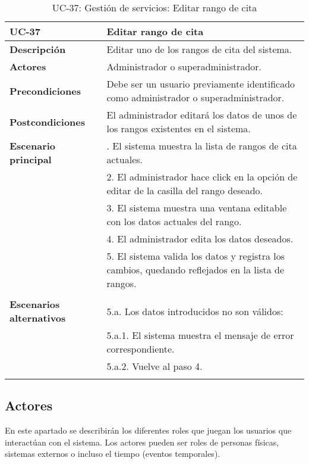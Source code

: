 \begin{table}[H]
  \begin{center}
    \begin{tabularx}{16.4cm}{|l|X|}
      \hline
      \textbf{UC-37} & \textbf{Editar rango de cita}\\
      \hline
      \textbf{Descripción} & Editar uno de los rangos de cita del sistema.\\
      \hline
      \textbf{Actores} & Administrador o superadministrador.\\
      \hline
      \textbf{Precondiciones} & Debe ser un usuario previamente identificado como administrador o superadministrador.\\
      \hline
      \textbf{Postcondiciones} & El administrador editará los datos de unos de los rangos existentes en el sistema.\\
      \hline
      \textbf{Escenario principal} & \smallskip 1. El sistema muestra la lista de rangos de cita actuales.\\
      & 2. El administrador hace click en la opción de editar de la casilla del rango deseado.\\
      & 3. El sistema muestra una ventana editable con los datos actuales del rango.\\
      & 4. El administrador edita los datos deseados.\\
      & 5. El sistema valida los datos y registra los cambios, quedando reflejados en la lista de rangos.\\
      & \\
      \hline
      \textbf{Escenarios alternativos} & \smallskip 5.a. Los datos introducidos no son válidos:\\
      & \hspace{0.3cm} 5.a.1. El sistema muestra el mensaje de error correspondiente.\\
      & \hspace{0.3cm} 5.a.2. Vuelve al paso 4.\\
      & \\
      \hline
    \end{tabularx}
    \caption{UC-37: Gestión de servicios: Editar rango de cita}
  \end{center}
\end{table}



\subsection{Actores} 
En este apartado se describirán los diferentes roles que juegan los usuarios que interactúan con el sistema. Los actores pueden ser roles de personas fí­sicas, sistemas externos o incluso el tiempo (eventos temporales).

